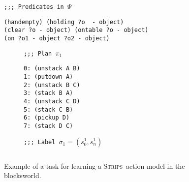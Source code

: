 \documentclass[letterpaper]{article} %
\newcommand{\strips}{\textsc{Strips}}     %
\begin{document}
\begin{figure}
{\tt ;;; Predicates in $\Psi$}
\begin{footnotesize}
\begin{verbatim}
(handempty) (holding ?o  - object)
(clear ?o - object) (ontable ?o - object)
(on ?o1 - object ?o2 - object)
\end{verbatim}
\end{footnotesize}

\vspace{0.2cm}

\begin{subfigure}{.25\textwidth}
{\tt ;;; Plan $\pi_1$}
\begin{footnotesize}
\begin{verbatim}
0: (unstack A B)
1: (putdown A)
2: (unstack B C)
3: (stack B A)
4: (unstack C D)
5: (stack C B)
6: (pickup D)
7: (stack D C)
\end{verbatim}
\end{footnotesize}
\end{subfigure}%
\begin{subfigure}{.6\textwidth}
{\tt ;;; Label $\sigma_1=(s_0^1,s_{n}^1)$}
\begin{lstlisting}[mathescape]
\end{lstlisting}
\vspace{0.1cm}
\vspace{0.6cm}
\end{subfigure}%

 \caption{\small Example of a task for learning a \strips\ action model in the blocksworld.}
\label{fig:lexample}
\end{figure}
\end{document}

